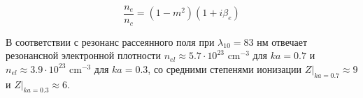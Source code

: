     \begin{equation}
        \frac{n_e}{n_c} = (1 - m^2) (1 + i \beta_e)
        \label{nenc_resonance}
    \end{equation}


В соответствии с  резонанс рассеянного поля при $\lambda_{10} = 83$ нм отвечает резонансной электронной плотности $n_{el} \approx 5.7 \cdot 10^{23}$ $\textrm{cm}^{-3}$ для $ka = 0.7$ и $n_{el} \approx 3.9 \cdot 10^{23}$ $\textrm{cm}^{-3}$ для $ka = 0.3$, со средними степенями ионизации $Z|_{ka = 0.7} \approx 9$ и $Z|_{ka = 0.3} \approx 6$.